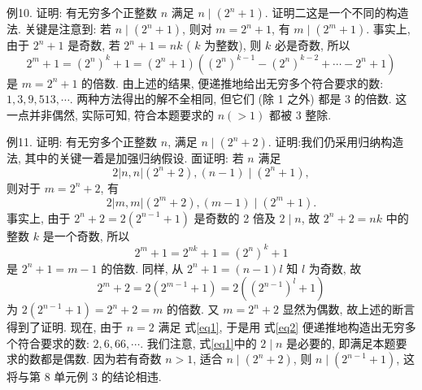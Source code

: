 例10. 证明: 有无穷多个正整数 $n$ 满足 $n \mid\left(2^n+1\right)$.
证明二这是一个不同的构造法.
关键是注意到: 若 $n \mid\left(2^n+1\right)$, 则对
$m=2^n+1$, 有 $m \mid\left(2^m+1\right)$.
事实上, 由于 $2^n+1$ 是奇数, 若 $2^n+1=n k$ ( $k$ 为整数), 则 $k$ 必是奇数, 所以
$$
2^m+1=\left(2^n\right)^k+1=\left(2^n+1\right)\left(\left(2^n\right)^{k-1}-\left(2^n\right)^{k-2}+\cdots-2^n+1\right)
$$
是 $m=2^n+1$ 的倍数.
由上述的结果, 便递推地给出无穷多个符合要求的数: $1,3,9,513, \cdots$.
两种方法得出的解不全相同, 但它们 (除 1 之外) 都是 3 的倍数.
这一点并非偶然, 实际可知, 符合本题要求的 $n(>1)$ 都被 3 整除.



例11. 证明: 有无穷多个正整数 $n$, 满足 $n \mid\left(2^n+2\right)$.
证明:我们仍采用归纳构造法, 其中的关键一着是加强归纳假设.
面证明: 若 $n$ 满足
$$
2|n, n|\left(2^n+2\right),(n-1) \mid\left(2^n+1\right), \label{eq1}
$$
则对于 $m=2^n+2$, 有
$$
2|m, m|\left(2^m+2\right),(m-1) \mid\left(2^m+1\right) . \label{eq2}
$$
事实上, 由于 $2^n+2=2\left(2^{n-1}+1\right)$ 是奇数的 2 倍及 $2 \mid n$, 故 $2^n+2=n k$ 中的整数 $k$ 是一个奇数, 所以
$$
2^m+1=2^{n k}+1=\left(2^n\right)^k+1
$$
是 $2^n+1=m-1$ 的倍数.
同样, 从 $2^n+1=(n-1) l$ 知 $l$ 为奇数, 故
$$
2^m+2=2\left(2^{m-1}+1\right)=2\left(\left(2^{n-1}\right)^l+1\right)
$$
为 $2\left(2^{n-1}+1\right)=2^n+2=m$ 的倍数.
又 $m=2^n+2$ 显然为偶数, 故上述的断言得到了证明.
现在, 由于 $n=2$ 满足 式\ref{eq1}, 于是用 式\ref{eq2} 便递推地构造出无穷多个符合要求的数: $2,6,66, \cdots$.
我们注意, 式\ref{eq1}中的 $2 \mid n$ 是必要的, 即满足本题要求的数都是偶数.
因为若有奇数 $n>1$, 适合 $n \mid\left(2^n+2\right)$, 则 $n \mid\left(2^{n-1}+1\right)$, 这将与第 8 单元例 3 的结论相违.


